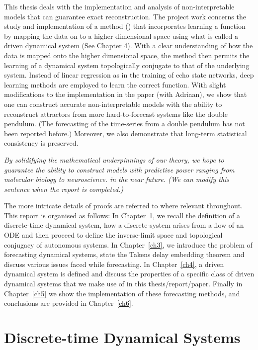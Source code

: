 \documentclass[a4paper,12pt,twoside]{report}
\begin{document}
This thesis deals with the implementation and analysis of non-interpretable models that can guarantee exact reconstruction. The project work concerns the study and implementation of a method (\cite{manjunath2021universal}) that incorporates learning a function by mapping the data on to a higher dimensional space using what is called a driven dynamical system (See Chapter 4). With a clear understanding of how the data is mapped onto the higher dimensional space, the method then permits the learning of a dynamical system topologically conjugate to that of the underlying system. Instead of linear regression as in the training of echo state networks, deep learning methods are employed to learn the correct function. With slight modifications to the implementation in the paper (with Adriaan), we show that one can construct accurate non-interpretable models with the ability to reconstruct attractors from more hard-to-forecast systems like the double pendulum. (The forecasting of the time-series from a double pendulum has not been reported before.) Moreover, we also demonstrate that long-term statistical consistency is preserved.

\emph{By solidifying the mathematical underpinnings of our theory, we hope to guarantee the ability to construct models with predictive power ranging from molecular biology to neuroscience. in the near future. (We can modify this sentence when the report is completed.)}

The more intricate details of proofs are referred to where relevant throughout. This report is organised as follows: 
\newline In Chapter~\ref{ch2}, we recall the definition of a discrete-time dynamical system, how a discrete-system arises from a flow of an ODE and then proceed to define the inverse-limit space and topological conjugacy of autonomous systems. 
\newline In Chapter~\ref{ch3}, we introduce the problem of forecasting dynamical systems, state the Takens delay embedding theorem and discuss various issues faced while forecasting. 
\newline In Chapter~\ref{ch4}, a driven dynamical system is defined and discuss the properties of a specific class of driven dynamical systems that we make use of in this thesis/report/paper. 
\newline Finally in Chapter~\ref{ch5} we show the implementation of these forecasting methods, and conclusions are provided in Chapter~\ref{ch6}.


\chapter{Discrete-time Dynamical Systems}\label{ch2}
\end{document}
